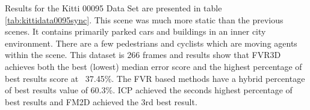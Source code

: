 Results for the Kitti 00095 Data Set are presented in table \ref{tab:kittidata0095sync}. This scene was much more static than the previous scenes. It contains primarily parked cars and buildings in an inner city environment. There are a few pedestrians and cyclists which are moving agents within the scene. This dataset is 266 frames and results show that FVR3D achieves both the best (lowest) median error score and the highest percentage of best results score at ~37.45\%. The FVR based methods have a hybrid percentage of best results value of 60.3\%. ICP achieved the seconds highest percentage of best results and FM2D achieved the 3rd best result. \\  

